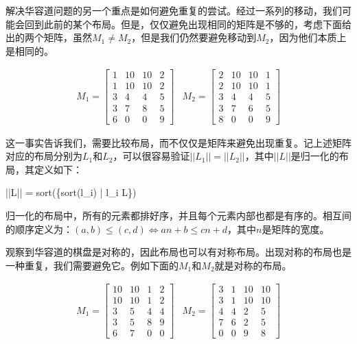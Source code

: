 \documentclass[UTF8]{article}
\begin{document}
解决华容道问题的另一个重点是如何避免重复的尝试。经过一系列的移动，我们可能会回到此前的某个布局。但是，仅仅避免出现相同的矩阵是不够的，考虑下面给出的两个矩阵，虽然$M_1 \neq M_2$，但是我们仍然要避免移动到$M_2$，因为他们本质上是相同的。

\[
\begin{array}{cc}
M_1 = \left [
  \begin{array}{cccc}
  1 & 10 & 10 & 2 \\
  1 & 10 & 10 & 2 \\
  3 & 4 & 4 & 5 \\
  3 & 7 & 8 & 5 \\
  6 & 0 & 0 & 9
  \end{array}
\right ] &
M_2 = \left [
  \begin{array}{cccc}
  2 & 10 & 10 & 1 \\
  2 & 10 & 10 & 1 \\
  3 & 4 & 4 & 5 \\
  3 & 7 & 6 & 5 \\
  8 & 0 & 0 & 9
  \end{array}
\right ]
\end{array}
\]

这一事实告诉我们，需要比较布局，而不仅仅是矩阵来避免出现重复。记上述矩阵对应的布局分别为$L_1$和$L_2$，可以很容易验证$||L_1|| = ||L_2||$，其中$||L||$是归一化的布局，其定义如下：

\be
||L|| = sort(\{sort(l_i) | \forall l_i \in L\})
\ee

归一化的布局中，所有的元素都排好序，并且每个元素内部也都是有序的。相互间的顺序定义为：$(a, b) \leq (c, d) \Leftrightarrow a n + b \leq c n + d$，其中$n$是矩阵的宽度。

观察到华容道的棋盘是对称的，因此布局也可以有对称布局。出现对称的布局也是一种重复，我们需要避免它。例如下面的$M_1$和$M_2$就是对称的布局。

\[
\begin{array}{cc}
M_1 = \left [
  \begin{array}{cccc}
  10 & 10 & 1 & 2 \\
  10 & 10 & 1 & 2 \\
  3 & 5 & 4 & 4 \\
  3 & 5 & 8 & 9 \\
  6 & 7 & 0 & 0
  \end{array}
\right ] &
M_2 = \left [
  \begin{array}{cccc}
  3 & 1 & 10 & 10 \\
  3 & 1 & 10 & 10 \\
  4 & 4 & 2 & 5 \\
  7 & 6 & 2 & 5 \\
  0 & 0 & 9 & 8
  \end{array}
\right ]
\end{array}
\]
\end{document}
